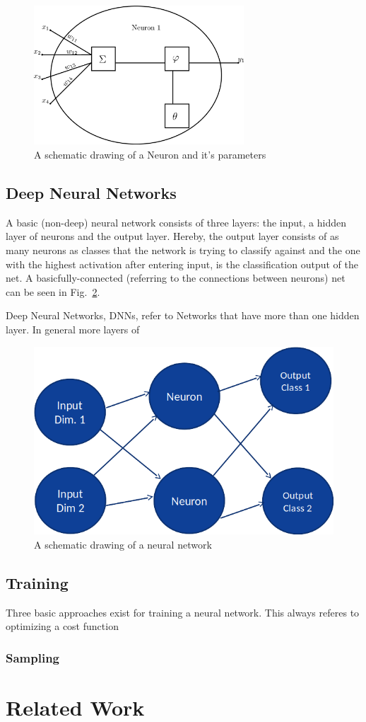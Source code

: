 \begin{figure}[h!]
\label{fig:neuron}
\caption{A schematic drawing of a Neuron and it's parameters}
\centering
\includegraphics[width=0.7\textwidth]{images/neuron.png}
\end{figure}

\subsection{Deep Neural Networks}
\label{sec:fund:DNN}

A basic (non-deep) neural network consists of three layers: the input, a hidden layer of neurons and the output layer. Hereby, the output layer consists of as many neurons as classes that the network is trying to classify against and the one with the highest activation after entering input, is the classification output of the net.  A basicfully-connected (referring to the connections between neurons) net can be seen in Fig.~\ref{fig:net}.

Deep Neural Networks, DNNs, refer to Networks that have more than one hidden layer. In general more layers of 

\begin{figure}
\label{fig:net}
\caption{A schematic drawing of a neural network}
\centering
\includegraphics{images/net.png}
\end{figure}


\subsection{Training}
\label{sec:fund:Train}
Three basic approaches exist for training a neural network. This always referes to optimizing a cost function


\subsubsection{Sampling}
\label{sec:fund:Sampling}

\section{Related Work}
\label{sec:fund:work}
